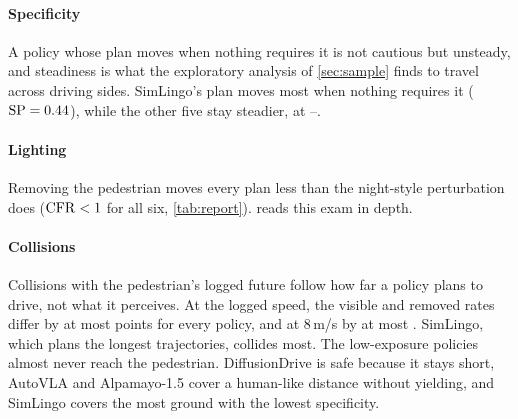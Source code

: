 \paragraph{Specificity}
A policy whose plan moves when nothing requires it is not cautious but unsteady, and steadiness is what the exploratory analysis of \cref{sec:sample} finds to travel across driving sides. SimLingo's
plan moves most when nothing requires it ($\mathrm{SP}=0.44$), while the other five stay steadier, at
\NumSpOtherLo--\NumSpOtherHi.

\paragraph{Lighting}
Removing the pedestrian moves every plan less than the night-style perturbation does ($\mathrm{CFR}<1$ for all six, \cref{tab:report}).  reads this exam in depth.

\paragraph{Collisions}
Collisions with the pedestrian's logged future follow how far a policy plans to drive, not what it perceives. At the logged
speed, the visible and removed rates differ by at most \NumCollGap{} points for every policy, and at
8\,m/s by at most \NumCollGapEight. SimLingo, which plans the longest trajectories, collides most. The low-exposure
policies almost never reach the pedestrian. DiffusionDrive is safe because it stays short, AutoVLA and Alpamayo-1.5 cover a human-like distance
without yielding, and SimLingo covers the most ground with the lowest specificity.

